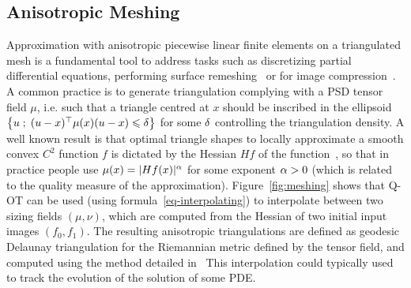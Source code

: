 

\subsection{Anisotropic Meshing}

Approximation with anisotropic piecewise linear finite elements on a triangulated mesh is a fundamental tool to address tasks such as discretizing partial differential equations, performing surface remeshing~\cite{alliez2003anisotropic} or for image compression~\cite{demaret2006image}.
%
A common practice is to generate triangulation complying with a PSD tensor field $\mu$, i.e. such that a triangle centred at $x$ should be inscribed in the ellipsoid $\left\{ u \;;\; (u-x)^\top \mu(x) (u-x) \leqslant \delta  \right\}$ for some $\delta$ controlling the triangulation density. 
%
A well known result is that optimal triangle shapes to locally approximate a smooth convex $C^2$ function $f$ is dictated by the Hessian $H f$ of the function~\cite{shewchuk2002good}, so that in practice people use $\mu(x) = |H f(x)|^\alpha$ for some exponent $\alpha > 0$ (which is related to the quality measure of the approximation).
%
Figure~\eqref{fig:meshing} shows that Q-OT can be used (using formula~\eqref{eq-interpolating}) to interpolate between two sizing fields $(\mu,\nu)$, which are computed from the Hessian of two initial input images $(f_0,f_1)$.
%
The resulting anisotropic triangulations are defined as geodesic Delaunay triangulation for the Riemannian metric defined by the tensor field, and computed using the method detailed in~\cite{peyre-iccv-09}
%
This interpolation could typically used to track the evolution of the solution of some PDE. 




